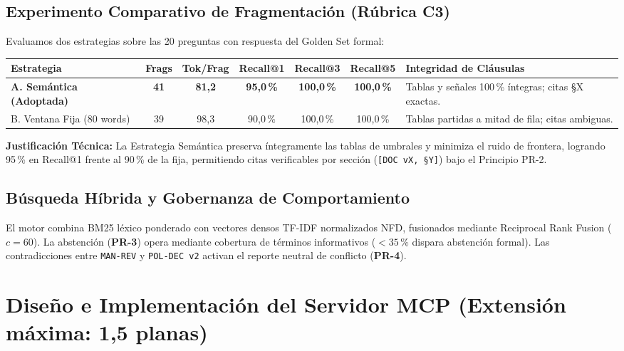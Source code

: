 \documentclass[11pt,letterpaper]{article}
\begin{document}
\subsection{Experimento Comparativo de Fragmentación (Rúbrica C3)}
Evaluamos dos estrategias sobre las 20 preguntas con respuesta del Golden Set formal:
\begin{table}[h!]
\small\centering
\begin{tabularx}{\textwidth}{lcccccY}
\toprule
\textbf{Estrategia} & \textbf{Frags} & \textbf{Tok/Frag} & \textbf{Recall@1} & \textbf{Recall@3} & \textbf{Recall@5} & \textbf{Integridad de Cláusulas} \\
\midrule
\textbf{A. Semántica (Adoptada)} & \textbf{41} & \textbf{81,2} & \textbf{95,0\,\%} & \textbf{100,0\,\%} & \textbf{100,0\,\%} & Tablas y señales 100\,\% íntegras; citas §X exactas. \\
B. Ventana Fija (80 words) & 39 & 98,3 & 90,0\,\% & 100,0\,\% & 100,0\,\% & Tablas partidas a mitad de fila; citas ambiguas. \\
\bottomrule
\end{tabularx}
\end{table}

\textbf{Justificación Técnica:} La Estrategia Semántica preserva íntegramente las tablas de umbrales y minimiza el ruido de frontera, logrando 95\,\% en Recall@1 frente al 90\,\% de la fija, permitiendo citas verificables por sección (\texttt{[DOC vX, §Y]}) bajo el Principio PR-2.

\subsection{Búsqueda Híbrida y Gobernanza de Comportamiento}
El motor combina BM25 léxico ponderado con vectores densos TF-IDF normalizados NFD, fusionados mediante Reciprocal Rank Fusion ($c=60$). La abstención (\textbf{PR-3}) opera mediante cobertura de términos informativos ($<35\,\%$ dispara abstención formal). Las contradicciones entre \texttt{MAN-REV} y \texttt{POL-DEC v2} activan el reporte neutral de conflicto (\textbf{PR-4}).

\newpage

\section{Diseño e Implementación del Servidor MCP (Extensión máxima: 1,5 planas)}
\end{document}
